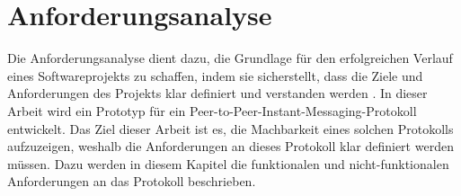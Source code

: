 \chapter{Anforderungsanalyse}
\label{chap:anforderungsanalyse}



Die Anforderungsanalyse dient dazu, die Grundlage für den erfolgreichen Verlauf eines Softwareprojekts zu schaffen, indem sie sicherstellt, dass die Ziele und Anforderungen des Projekts klar definiert und verstanden werden \parencite{Zakharyan_SoftwareRequirementsForMessagingService}. In dieser Arbeit wird ein Prototyp für ein Peer-to-Peer-Instant-Messaging-Protokoll entwickelt. Das Ziel dieser Arbeit ist es, die Machbarkeit eines solchen Protokolls aufzuzeigen, weshalb die Anforderungen an dieses Protokoll klar definiert werden müssen. Dazu werden in diesem Kapitel die funktionalen und nicht-funktionalen Anforderungen an das Protokoll beschrieben. 





